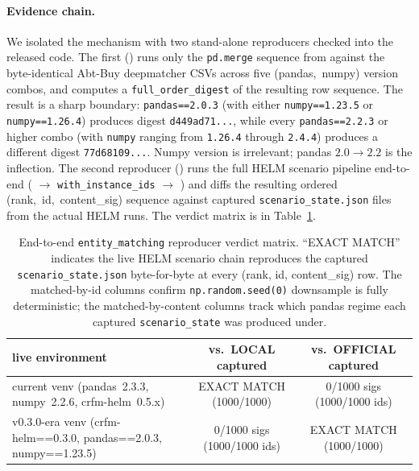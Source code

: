 \paragraph{Evidence chain.}
We isolated the mechanism with two stand-alone reproducers checked into
  the released code.
The first
  () runs only the
  \texttt{pd.merge} sequence from
   against the
  byte-identical Abt-Buy deepmatcher CSVs across five
  \mbox{(pandas, numpy)} version combos, and computes a
  \texttt{full\_order\_digest} of the resulting row sequence.
The result is a sharp boundary: \texttt{pandas==2.0.3} (with either
  \texttt{numpy==1.23.5} or \texttt{numpy==1.26.4}) produces digest
  \texttt{d449ad71...}, while every \texttt{pandas==2.2.3} or higher
  combo (with \texttt{numpy} ranging from \texttt{1.26.4} through
  \texttt{2.4.4}) produces a different digest \texttt{77d68109...}.
Numpy version is irrelevant; pandas $2.0 \rightarrow 2.2$ is the
  inflection.
The second reproducer
  () runs the full HELM scenario
  pipeline end-to-end (
  $\rightarrow$ \texttt{with\_instance\_ids} $\rightarrow$
  ) and diffs the resulting
  ordered \mbox{(rank, id, content\_sig)} sequence against captured
  \texttt{scenario\_state.json} files from the actual HELM runs.
The verdict matrix is in Table~\ref{tab:helm-em-mwe-v2}.

\begin{table}[htbp]
\centering
\small
\caption{End-to-end \texttt{entity\_matching} reproducer verdict
  matrix.
``EXACT MATCH'' indicates the live HELM scenario chain reproduces the
  captured \texttt{scenario\_state.json} byte-for-byte at every
  (rank, id, content\_sig) row.
The matched-by-id columns confirm \texttt{np.random.seed(0)} downsample
  is fully deterministic; the matched-by-content columns track which
  pandas regime each captured \texttt{scenario\_state} was produced
  under.}
\label{tab:helm-em-mwe-v2}
\begin{tabular}{l c c}
\toprule
live environment & vs.\ LOCAL captured & vs.\ OFFICIAL captured \\
\midrule
current venv (pandas~2.3.3, numpy~2.2.6, crfm-helm~0.5.x)   & EXACT MATCH (1000/1000) & 0/1000 sigs (1000/1000 ids) \\
v0.3.0-era venv (crfm-helm==0.3.0, pandas==2.0.3, numpy==1.23.5) & 0/1000 sigs (1000/1000 ids) & EXACT MATCH (1000/1000) \\
\bottomrule
\end{tabular}
\end{table}


